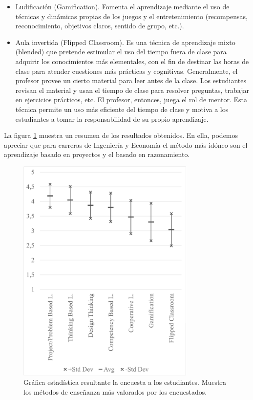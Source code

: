 \documentclass[conference]{IEEEtran}
\begin{document}
\begin{itemize}
    \item Ludificación (Gamification). Fomenta el aprendizaje mediante el uso de técnicas y dinámicas propias de los juegos y el entretenimiento (recompensas, reconocimiento, objetivos claros, sentido de grupo, etc.). 

    \item Aula invertida (Flipped Classroom). Es una técnica de aprendizaje mixto (blended) que pretende estimular el uso del tiempo fuera de clase para adquirir los conocimientos más elementales, con el fin de destinar las horas de clase para atender cuestiones más prácticas y cognitivas. Generalmente, el profesor provee un cierto material para leer antes de la clase. Los estudiantes revisan el material y usan el tiempo de clase para resolver preguntas, trabajar en ejercicios prácticos, etc. El profesor, entonces, juega el rol de mentor. Esta técnica permite un uso más eficiente del tiempo de clase y motiva a los estudiantes a tomar la responsabilidad de su propio aprendizaje.

\end{itemize}

La figura \ref{fig:met_preferidos} muestra un resumen de los resultados obtenidos. En ella, podemos apreciar que para carreras de Ingeniería y Economía el método más idóneo son el aprendizaje basado en proyectos y el basado en razonamiento.



\begin{figure}[htbp]
\centering
\includegraphics[width=250pt,height=321pt]{encuesta_learning.png}
\caption{Gráfica estadística resultante la encuesta a los estudiantes. Muestra los métodos de enseñanza más valorados por los encuestados.}
\label{fig:met_preferidos}
\end{figure}
\end{document}
